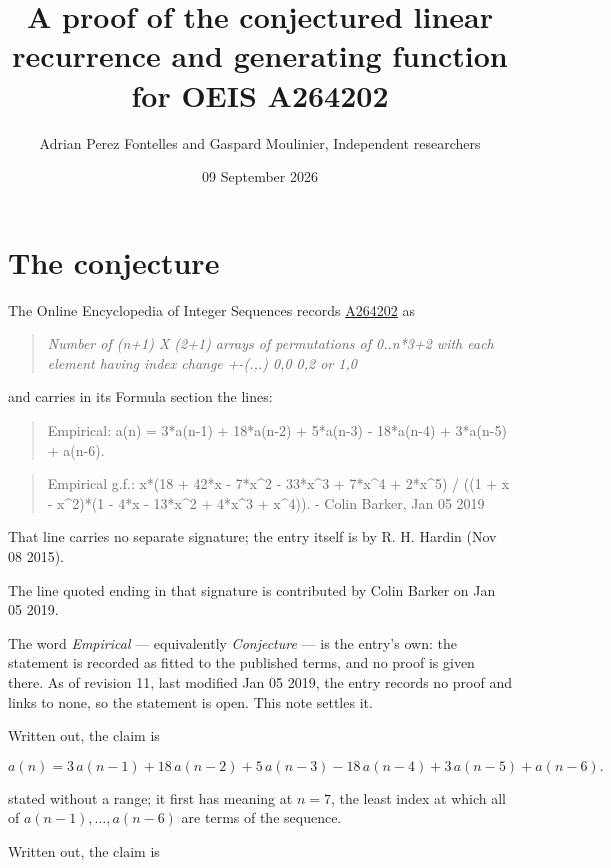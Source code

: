 \documentclass[11pt]{article}
\title{A proof of the conjectured linear recurrence and generating function for OEIS A264202}
\author{Adrian Perez Fontelles and Gaspard Moulinier, Independent researchers}
\date{09 September 2026}
\theoremstyle{definition}
\begin{document}
\maketitle
\section{The conjecture}

The Online Encyclopedia of Integer Sequences records \href{https://oeis.org/A264202}{A264202} as

\begin{quote}\itshape Number of (n+1) X (2+1) arrays of permutations of 0..n*3+2 with each element having index change +-(.,.) 0,0 0,2 or 1,0\end{quote}

and carries in its Formula section the lines:

\begin{quote}\ttfamily Empirical: a(n) = 3*a(n-1) + 18*a(n-2) + 5*a(n-3) - 18*a(n-4) + 3*a(n-5) + a(n-6).\end{quote}

\begin{quote}\ttfamily Empirical g.f.: x*(18 + 42*x - 7*x\textasciicircum{}2 - 33*x\textasciicircum{}3 + 7*x\textasciicircum{}4 + 2*x\textasciicircum{}5) / ((1 + x - x\textasciicircum{}2)*(1 - 4*x - 13*x\textasciicircum{}2 + 4*x\textasciicircum{}3 + x\textasciicircum{}4)). - Colin Barker, Jan 05 2019\end{quote}

That line carries no separate signature; the entry itself is by R. H. Hardin (Nov 08 2015).

The line quoted ending in that signature is contributed by Colin Barker on Jan 05 2019.

The word {\itshape Empirical} --- equivalently {\itshape Conjecture} --- is the entry's own: the statement is recorded as fitted to the published terms, and no proof is given there. As of revision 11, last modified Jan 05 2019, the entry records no proof and links to none, so the statement is open. This note settles it.

Written out, the claim is

\[a(n) = 3\,a(n-1) + 18\,a(n-2) + 5\,a(n-3) - 18\,a(n-4) + 3\,a(n-5) + a(n-6).\]

stated without a range; it first has meaning at $n = 7$, the least index at which all of $a(n-1),\dots,a(n-6)$ are terms of the sequence.

Written out, the claim is
\end{document}
